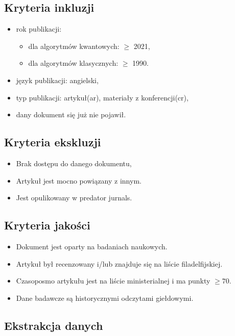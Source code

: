 \documentclass[polish,envcountsect,10pt]{article}
\begin{document}
\subsection{Kryteria inkluzji}
\begin{itemize}
	\item rok publikacji: 
	\begin{itemize}
		\item dla algorytmów kwantowych: $\ge$ 2021,
		\item dla algorytmów klasycznych: $\ge$ 1990.
	\end{itemize}
	\item język publikacji: angielski,
	\item typ publikacji: artykuł(ar), materiały z konferencji(cr),
	\item dany dokument się już nie pojawił.
\end{itemize}

\subsection{Kryteria ekskluzji}

\begin{itemize}
	\item Brak dostępu do danego dokumentu,
	\item Artykuł jest mocno powiązany z innym.
	\item Jest opulikowany w predator jurnals.
\end{itemize}

\subsection{Kryteria jakości}

\begin{itemize}
	\item Dokument jest oparty na badaniach naukowych.
	\item Artykuł był recenzowany i/lub znajduje się na liście filadelfijskiej.
	\item Czasoposmo artykułu jest na liście ministerialnej i ma punkty $\ge70$.
	\item Dane badawcze są historycznymi odczytami giełdowymi.
\end{itemize}

\subsection{Ekstrakcja danych}
\end{document}
